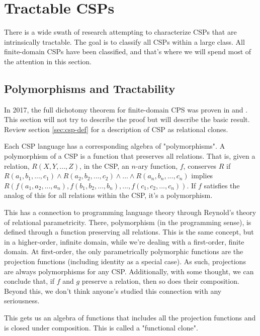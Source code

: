 \section{Tractable CSPs}\label{sec:tractable-csps}

There is a wide swath of research attempting to characterize CSPs that are intrinsically tractable. The goal is to classify all CSPs within a large class. All finite-domain CSPs have been classified, and that's where we will spend most of the attention in this section.

\subsection{Polymorphisms and Tractability}\label{sec:polymorphisms}

In 2017, the full dichotomy theorem for finite-domain CPS was proven in \citep{bulatov2017dichotomy} and \citep{zhuk2020proof}. This section will not try to describe the proof but will describe the basic result. Review section \ref{sec:csp-def} for a description of CSP as relational clones.

Each CSP language has a corresponding algebra of "polymorphisms". A polymorphism of a CSP is a function that preserves all relations. That is, given a relation, $R(X, Y, ..., Z)$, in the CSP, an $n$-ary function, $f$, conserves $R$ if $R(a_1, b_1, ..., c_1) \wedge R(a_2, b_2, ..., c_2) \wedge ... \wedge R(a_n, b_n, ..., c_n)$ implies $R(f(a_1, a_2, ..., a_n), f(b_1, b_2, ..., b_n), ..., f(c_1, c_2, ..., c_n))$. If $f$ satisfies the analog of this for all relations within the CSP, it’s a polymorphism.

\begin{remark}
This has a connection to programming language theory through Reynold’s theory of relational parametricity. There, polymorphism (in the programming sense), is defined through a function preserving all relations. This is the same concept, but in a higher-order, infinite domain, while we’re dealing with a first-order, finite domain. At first-order, the only parametrically polymorphic functions are the projection functions (including identity as a special case). As such, projections are always polymorphisms for any CSP. Additionally, with some thought, we can conclude that, if $f$ and $g$ preserve a relation, then so does their composition. Beyond this, we don’t think anyone’s studied this connection with any seriousness.
\end{remark}

This gets us an algebra of functions that includes all the projection functions and is closed under composition. This is called a "functional clone".


